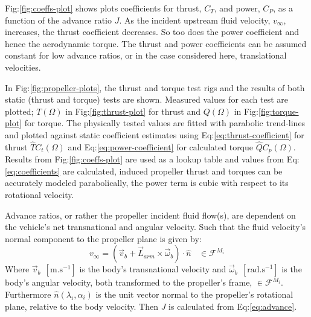 \par
Fig:\ref{fig:coeffs-plot} shows plots coefficients for thrust, {\color{Blue}$C_{T}$}, and power, {\color{Red}$C_{P}$}, as a function of the advance ratio $J$. As the incident upstream fluid velocity, $v_\infty$, increases, the thrust coefficient decreases. So too does the power coefficient and hence the aerodynamic torque. The thrust and power coefficients can be assumed constant for low advance ratios, or in the case considered here, translational velocities.
\par
In Fig:\ref{fig:propeller-plots}, the thrust and torque test rigs and the results of both static (thrust and torque) tests are shown. Measured values for each test are plotted; {\color{Red}$T(\Omega)$} in Fig:\ref{fig:thrust-plot} for thrust and {\color{Red}$Q(\Omega)$} in Fig:\ref{fig:torque-plot} for torque. The physically tested values are fitted with parabolic trend-lines and plotted against static coefficient estimates using Eq:\ref{eq:thrust-coefficient} for thrust {\color{LimeGreen}$\hat{T}C_t(\Omega)$} and Eq:\ref{eq:power-coefficient} for calculated torque {\color{LimeGreen}$\hat{Q}C_p(\Omega)$}. Results from Fig:\ref{fig:coeffs-plot} are used as a lookup table and values from Eq:\ref{eq:coefficients} are calculated, induced propeller thrust and torques can be accurately modeled parabolically, the power term is cubic with respect to its rotational velocity. 
\par
Advance ratios, or rather the propeller incident fluid flow(s), are dependent on the vehicle's net transnational and angular velocity. Such that the fluid velocity's normal component to the propeller plane is given by:
\begin{equation}\label{eq:normal-fluid}
v_\infty = (\vec{v}_b + \vec{L}_{arm}\times \vec{\omega}_b)\cdot \hat{n}~~~~\in\mathcal{F}^{M_i}
\end{equation}
Where $\vec{v}_b~~[\text{m.s}^{-1}]$ is the body's transnational velocity and $\vec{\omega}_b~~[\text{rad.s}^{-1}]$ is the body's angular velocity, both transformed to the propeller's frame, $\in\mathcal{F}^{M_i}$. Furthermore $\hat{n}(\lambda_i,\alpha_i)$ is the unit vector normal to the propeller's rotational plane, relative to the body velocity. Then $J$ is calculated from Eq:\ref{eq:advance}.
